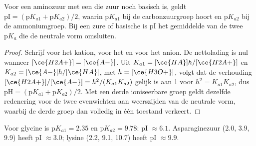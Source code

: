 \begin{proposition}\label{prop:b2:biomolecules:pi}
Voor een aminozuur met een  die zuur noch basisch is, geldt $\mathrm{pI} = (\mathrm pK_{a1} +
\mathrm pK_{a2})/2$, waarin $\mathrm pK_{a1}$ bij de carbonzuurgroep hoort en $\mathrm pK_{a2}$ bij de
ammoniumgroep. Bij een zure of basische  is pI het gemiddelde van de twee $\mathrm pK_a$ die de
neutrale vorm omsluiten.
\end{proposition}

\begin{proof}
Schrijf  voor het kation,  voor het  en  voor het anion. De nettolading is
nul wanneer $[\ce{H2A+}] = [\ce{A-}]$. Uit $K_{a1} = [\ce{HA}]h/[\ce{H2A+}]$ en $K_{a2} =
[\ce{A-}]h/[\ce{HA}]$, met $h = [\ce{H3O+}]$, volgt dat de verhouding $[\ce{H2A+}]/[\ce{A-}] = h^2/(K_{a1}K_{a2})$
gelijk is aan 1 voor $h^2 = K_{a1}K_{a2}$, dus $\mathrm{pH} = (\mathrm pK_{a1} + \mathrm pK_{a2})/2$. Met een
derde ioniseerbare groep geldt dezelfde redenering voor de twee evenwichten aan weerszijden van de neutrale
vorm, waarbij de derde groep dan volledig in één toestand verkeert.
\end{proof}

Voor glycine is $\mathrm pK_{a1} = 2.35$ en $\mathrm pK_{a2} = 9.78$: pI $\approx 6.1$. Asparaginezuur
(2.0, 3.9, 9.9) heeft pI $\approx 3.0$; lysine (2.2, 9.1, 10.7) heeft pI $\approx 9.9$.

